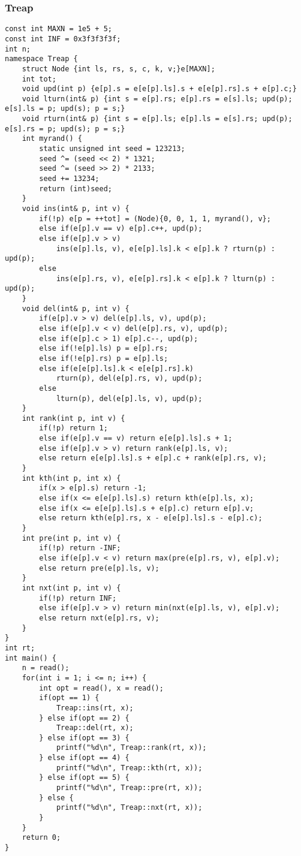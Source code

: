 \documentclass{article}
\begin{document}
   \subsubsection{Treap}
\begin{lstlisting}
const int MAXN = 1e5 + 5;
const int INF = 0x3f3f3f3f;
int n;
namespace Treap {
	struct Node {int ls, rs, s, c, k, v;}e[MAXN];
	int tot;
	void upd(int p) {e[p].s = e[e[p].ls].s + e[e[p].rs].s + e[p].c;}
	void lturn(int& p) {int s = e[p].rs; e[p].rs = e[s].ls; upd(p); e[s].ls = p; upd(s); p = s;}
	void rturn(int& p) {int s = e[p].ls; e[p].ls = e[s].rs; upd(p); e[s].rs = p; upd(s); p = s;}
	int myrand() {
		static unsigned int seed = 123213;
		seed ^= (seed << 2) * 1321;
		seed ^= (seed >> 2) * 2133;
		seed += 13234;
		return (int)seed;
	}
	void ins(int& p, int v) {
		if(!p) e[p = ++tot] = (Node){0, 0, 1, 1, myrand(), v};
		else if(e[p].v == v) e[p].c++, upd(p);
		else if(e[p].v > v)
			ins(e[p].ls, v), e[e[p].ls].k < e[p].k ? rturn(p) : upd(p);
		else 
			ins(e[p].rs, v), e[e[p].rs].k < e[p].k ? lturn(p) : upd(p);
	}
	void del(int& p, int v) {
		if(e[p].v > v) del(e[p].ls, v), upd(p);
		else if(e[p].v < v) del(e[p].rs, v), upd(p);
		else if(e[p].c > 1) e[p].c--, upd(p);
		else if(!e[p].ls) p = e[p].rs;
		else if(!e[p].rs) p = e[p].ls;
		else if(e[e[p].ls].k < e[e[p].rs].k)
			rturn(p), del(e[p].rs, v), upd(p);
		else
			lturn(p), del(e[p].ls, v), upd(p);
	}
	int rank(int p, int v) {
		if(!p) return 1;
		else if(e[p].v == v) return e[e[p].ls].s + 1;
		else if(e[p].v > v) return rank(e[p].ls, v);
		else return e[e[p].ls].s + e[p].c + rank(e[p].rs, v);
	}
	int kth(int p, int x) {
		if(x > e[p].s) return -1;
		else if(x <= e[e[p].ls].s) return kth(e[p].ls, x);
		else if(x <= e[e[p].ls].s + e[p].c) return e[p].v;
		else return kth(e[p].rs, x - e[e[p].ls].s - e[p].c);
	}
	int pre(int p, int v) {
		if(!p) return -INF;
		else if(e[p].v < v) return max(pre(e[p].rs, v), e[p].v);
		else return pre(e[p].ls, v);
	}
	int nxt(int p, int v) {
		if(!p) return INF;
		else if(e[p].v > v) return min(nxt(e[p].ls, v), e[p].v);
		else return nxt(e[p].rs, v);
	}	
}
int rt;
int main() {
	n = read();
	for(int i = 1; i <= n; i++) {
		int opt = read(), x = read();
		if(opt == 1) {
			Treap::ins(rt, x);
		} else if(opt == 2) {
			Treap::del(rt, x);
		} else if(opt == 3) {
			printf("%d\n", Treap::rank(rt, x));
		} else if(opt == 4) {
			printf("%d\n", Treap::kth(rt, x));
		} else if(opt == 5) {
			printf("%d\n", Treap::pre(rt, x));
		} else {
			printf("%d\n", Treap::nxt(rt, x));
		}
	}
	return 0;
}
\end{lstlisting}
\end{document}
